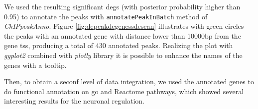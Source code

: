We used the resulting significant \glspl{deg} (with posterior probability higher than 0.95) to annotate the peaks with \lstinline!annotatePeakInBatch! method of \textit{ChIPpeakAnno}.
Figure 	\ref{fig:depeakdegenessdescan} illustrates with green circles the peaks with an annotated gene with distance lower than 10000bp from the gene \gls{tss}, producing a total of 430 annotated peaks.
Realizing the plot with \textit{ggplot2} combined with \textit{plotly} library it is possible to enhance the names of the genes with a tooltip.

Then, to obtain a seconf level of data integration, we used the annotated genes to do functional annotation on \gls{go} \cite{GeneOntologyConsortium2004, GeneOntologyConsortium2015} and Reactome pathways, which showed several interesting results for the neuronal regulation.









